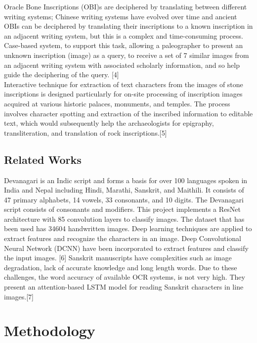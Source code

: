 Oracle Bone Inscriptions (OBI)s are deciphered by translating between different writing systems; Chinese writing systems have evolved over time and ancient OBIs can be deciphered by translating their inscriptions to a known inscription in an adjacent writing system, but this is a complex and time-consuming process. Case-based system, to support this task, allowing a paleographer to present an unknown inscription (image) as a query, to receive a set of 7 similar images from an adjacent writing system with associated scholarly information, and so help guide the deciphering of the query. [4] 
\\Interactive technique for extraction of text characters from the images of stone inscriptions is designed particularly for on-site processing of inscription images acquired at various historic palaces, monuments, and temples. The process involves character spotting and extraction of the inscribed information to editable text, which would subsequently help the archaeologists for epigraphy, transliteration, and translation of rock inscriptions.[5]
\section{Related Works}
Devanagari is an Indic script and forms a basis for over 100 languages spoken in India and Nepal including Hindi, Marathi, Sanskrit, and Maithili. It consists of 47 primary alphabets, 14 vowels, 33 consonants, and 10 digits. The Devanagari script consists of consonants and modifiers. This project implements a ResNet architecture with 85 convolution layers to classify images. The dataset that has been used has 34604 handwritten images. Deep learning techniques are applied to extract features and recognize the characters in an image. Deep Convolutional Neural Network (DCNN) have been incorporated to extract features and classify the input images. [6] Sanskrit manuscripts have complexities such as image degradation, lack of accurate knowledge and long length words. Due to these challenges, the word accuracy of available OCR systems, is not very high. They present an attention-based LSTM model for reading Sanskrit characters in line images.[7]







\chapter{Methodology}
  
